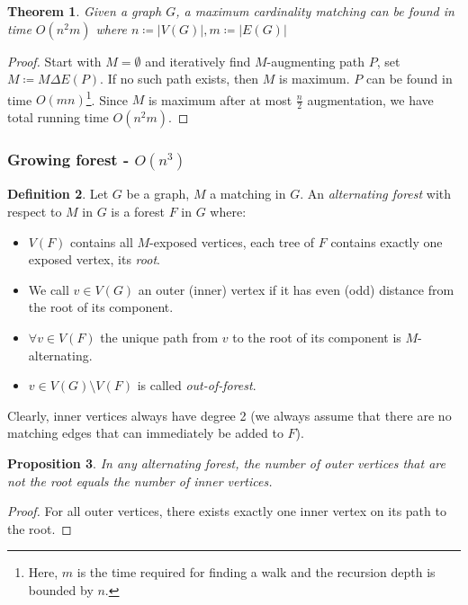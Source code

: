 \documentclass[11pt, a4paper]{article}
\newcommand{\abs}[1]{\left\lvert#1\right\rvert}
\newtheorem{theorem}{Theorem}[section]
\newtheorem{prop}[theorem]{Proposition}
\theoremstyle{remark}
\theoremstyle{definition}
\newtheorem{definition}[theorem]{Definition}
\begin{document}
\begin{theorem}
Given a graph $G$, a maximum cardinality matching can be found in time
$O(n^2m)$ where $n\coloneqq\abs{V(G)}, m\coloneqq\abs{E(G)}$
\end{theorem}
\begin{proof}
Start with $M=\emptyset$ and iteratively find $M$-augmenting path $P$,
set $M\coloneqq M\Delta E(P)$. If no such path exists, then $M$ is
maximum. $P$ can be found in time $O(mn)$\footnote{
	Here, $m$ is the time required for finding a walk and the recursion
	depth is bounded by $n$.
}. Since $M$ is maximum after at most $\frac{n}{2}$ augmentation, we have
total running time $O(n^2m)$.
\end{proof}


\subsubsection{Growing forest\texorpdfstring{ - $O(n^3)$}{}}
\begin{definition}
Let $G$ be a graph, $M$ a matching in $G$. An \emph{alternating forest}
with respect to $M$ in $G$ is a forest $F$ in $G$ where:
\begin{itemize}
	\item $V(F)$ contains all $M$-exposed vertices, each tree of $F$
	contains exactly one exposed vertex, its \emph{root}.
	\item We call $v\in V(G)$ an outer (inner) vertex if it has even
	(odd) distance from the root of its component.
	\item $\forall v\in V(F)$ the unique path from $v$ to the root of
	its component is $M$-alternating.
	\item $v\in V(G)\setminus V(F)$ is called \emph{out-of-forest}.
\end{itemize}
Clearly, inner vertices always have degree 2 (we always assume that there
are no matching edges that can immediately be added to $F$).
\end{definition}

\begin{prop}
In any alternating forest, the number of outer vertices that are not the
root equals the number of inner vertices.
\end{prop}
\begin{proof}
For all outer vertices, there exists exactly one inner vertex on its path
to the root.
\end{proof}
\end{document}
